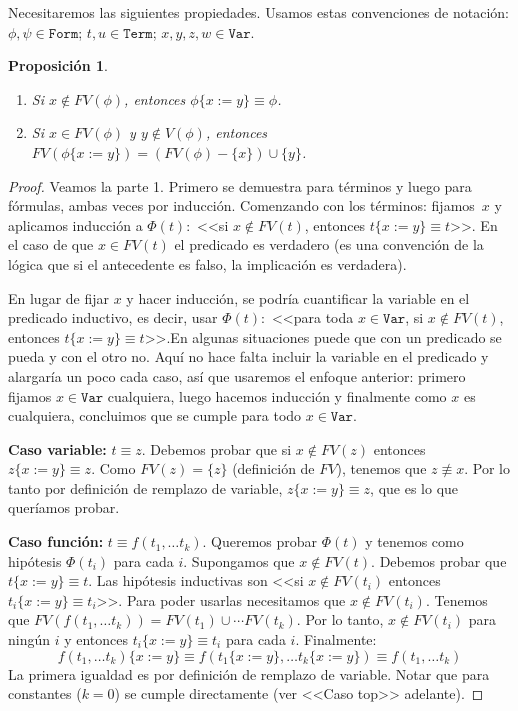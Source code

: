 \documentclass[a4paper, 12pt]{report}
\newtheorem{prop}[teorema]{Proposición}
\theoremstyle{definition}
\begin{document}
Necesitaremos las siguientes propiedades. Usamos estas convenciones de notación: $\phi,\psi\in\mathtt{Form}$; $t,u\in\mathtt{Term}$; $x,y,z,w\in\mathtt{Var}$.

\begin{prop}\label{prop-remplVar1}
	\begin{enumerate}
		\item Si $x\not\in FV(\phi)$, entonces $\phi\{x:=y\}\equiv\phi$.
		\item Si $x\in FV(\phi)$ y $y\not\in V(\phi)$, entonces $FV(\phi\{x:=y\})=(FV(\phi)-\{x\})\cup\{y\}$.
	\end{enumerate}
\end{prop}
\begin{proof}
	Veamos la parte 1. Primero se demuestra para términos y luego para fórmulas, ambas veces por inducción. Comenzando con los términos: fijamos~$x$ y  aplicamos inducción a $\Phi(t):$ <<si $x\not\in FV(t)$, entonces $t\{x:=y\}\equiv t$>>. En el caso de que $x\in FV(t)$ el predicado es verdadero (es una convención de la lógica que si el antecedente es falso, la implicación es verdadera).
	
	En lugar de fijar $x$ y hacer inducción, se podría cuantificar la variable en el predicado inductivo, es decir, usar $\Phi(t):$ <<para toda $x\in\mathtt{Var}$, si $x\not\in FV(t)$, entonces $t\{x:=y\}\equiv t$>>.\linebreak En algunas situaciones puede que con un predicado se pueda y con el otro no. Aquí no hace falta incluir la variable en el predicado y alargaría un poco cada caso, así que usaremos el enfoque anterior: primero fijamos $x\in\mathtt{Var}$ cualquiera, luego hacemos inducción y finalmente como $x$ es cualquiera, concluimos que se cumple para todo $x\in\mathtt{Var}$.
	
	\textbf{Caso variable:} $t\equiv z$. Debemos probar que si $x\not\in FV(z)$ entonces $z\{x:=y\}\equiv z$. Como $FV(z)=\{z\}$ (definición de $FV$), tenemos que $z\not\equiv x$. Por lo tanto por definición de remplazo de variable, $z\{x:=y\}\equiv z$, que es lo que queríamos probar.
	
	\textbf{Caso función:} $t\equiv f(t_1,\dots t_k)$. Queremos probar $\Phi(t)$ y tenemos como hipótesis $\Phi(t_i)$ para cada $i$. Supongamos que $x\not\in FV(t)$. Debemos probar que $t\{x:=y\}\equiv t$. Las hipótesis inductivas son <<si $x\not\in FV(t_i)$ entonces $t_i\{x:=y\}\equiv t_i$>>. Para poder usarlas necesitamos que $x\not\in FV(t_i)$. Tenemos que $FV(f(t_1,\dots t_k))=FV(t_1)\cup\cdots FV(t_k)$. Por lo tanto, $x\not\in FV(t_i)$ para ningún $i$ y entonces $t_i\{x:=y\}\equiv t_i$ para cada $i$. Finalmente:
	$$ f(t_1,\dots t_k)\{x:=y\}\equiv f(t_1\{x:=y\},\dots t_k\{x:=y\}) \equiv f(t_1,\dots t_k)
	$$
	La primera igualdad es por definición de remplazo de variable. Notar que para constantes ($k=0$) se cumple directamente (ver <<Caso top>> adelante).
	

\end{proof}
\end{document}
